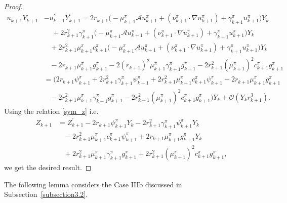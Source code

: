 \documentclass{article}
\theoremstyle{definition}
\numberwithin{equation}{section}
\begin{document}
\begin{proof}
\begin{align}
u_{k+1}Y_{k+1} &- u_{k+1}^{'}Y_{k+1}^{'} = 2r_{k+1}\Big(-\mu_{k+1}^{\pi}\mathcal{A}u_{k+1}^{\pi}+ (\nu_{k+1}^{\pi} \cdot \nabla u_{k+1}^{\pi}) + \gamma_{k+1}^{\pi}u_{k+1}^{\pi}\Big)Y_{k} 
\nonumber \\  &  \;\;\;\;  + 2r_{k+1}^{2}\gamma_{k+1}^{\pi}\Big(-\mu_{k+1}^{\pi}\mathcal{A}u_{k+1}^{\pi} + (\nu_{k+1}^{\pi}\cdot \nabla u_{k+1}^{\pi})  + \gamma_{k+1}^{\pi}u_{k+1}^{\pi}\Big)Y_{k} 
\nonumber  \\ & \;\;\; 
+ 2r_{k+1}^{2}\mu_{k+1}^{\pi}c_{k+1}^{\pi}\Big(- \mu_{k+1}^{\pi}\mathcal{A}u_{k+1}^{\pi} + (\nu_{k+1}^{\pi}\cdot \nabla u_{k+1}^{\pi}) + \gamma_{k+1}^{\pi}u_{k+1}^{\pi}\Big)Y_{k}  \nonumber \\ & \;\;\;  - 2r_{k+1}\mu_{k+1}^{\pi}g_{k+1}^{\pi} - 2(r_{k+1})^{2}\mu_{k+1}^{\pi}\gamma_{k+1}^{\pi}g_{k+1}^{\pi} - 2r_{k+1}^{2}(\mu_{k+1}^{\pi})^{2}c_{k+1}^{\pi}g_{k+1}^{\pi} \nonumber \\ & 
= \big(2r_{k+1}\psi_{k+1}^{\pi} + 2 r_{k+1}^{2}\gamma_{k+1}^{\pi} \psi_{k+1}^{\pi} + 2r_{k+1}^{2}\mu_{k+1}^{\pi}c_{k+1}^{\pi} \psi_{k+1}^{\pi} - 2r_{k+1}\mu_{k+1}^{\pi}g_{k+1}^{\pi} 
\nonumber 
\\ &  \;\;\; - 2r_{k+1}^{2}\mu_{k+1}^{\pi}\gamma_{k+1}^{\pi}g_{k+1}^{\pi} - 2r_{k+1}^{2}(\mu_{k+1}^{\pi})^{2}c_{k+1}^{\pi}g_{k+1}^{\pi}\big)Y_k + \mathcal{O}(Y_k r^{3}_{k+1}).
\end{align}
Using the relation \eqref{sym_z} i.e. 
\begin{align*}
    Z_{k+1} &= Z_{k+1}^{'} -   2r_{k+1}\psi^{\pi}_{k+1}Y_{k} - 2 r_{k+1}^{2}\gamma^{\pi}_{k+1} \psi^{\pi}_{k+1}Y_{k}
\nonumber \\& \;\;\;- 2r_{k+1}^{2}\mu^{\pi}_{k+1}c^{\pi}_{k+1} \psi^{\pi}_{k+1} + 2r_{k+1}\mu^{\pi}_{k+1}g^{\pi}_{k+1}Y_{k} 
\nonumber \\& \;\;\;+ 2r_{k+1}^2\mu^{\pi}_{k+1}\gamma^{\pi}_{k+1}g^{\pi}_{k+1}    +  2r_{k+1}^{2}(\mu^{\pi}_{k+1})^{2}c^{\pi}_{k+1}g^{\pi}_{k+1},
\end{align*}
we get the desired result. 
\end{proof}

The following lemma considers the Case IIIb discussed in Subsection~\ref{subsection3.2}. 
\end{document}
